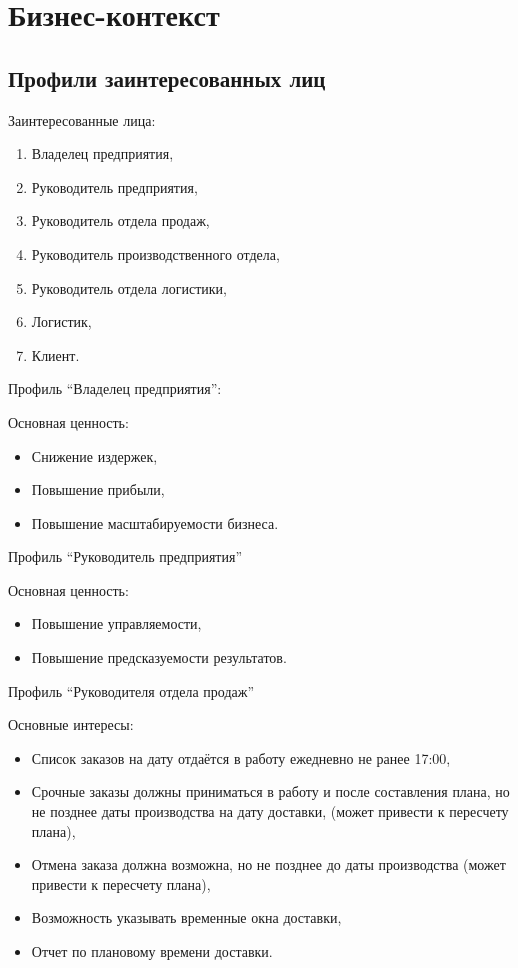 \chapter{Бизнес-контекст}
\label{ch:chap4}


\section{Профили заинтересованных лиц}
\label{sec:stakeholders}

Заинтересованные лица:
\begin{enumerate}[label=\arabic*]
    \item Владелец предприятия,
    \item Руководитель предприятия,
    \item Руководитель отдела продаж,
    \item Руководитель производственного отдела,
    \item Руководитель отдела логистики,
    \item Логистик,
    \item Клиент.
\end{enumerate}

Профиль ``Владелец предприятия'':

Основная ценность:
\begin{itemize}
    \item Снижение издержек,
    \item Повышение прибыли,
    \item Повышение масштабируемости бизнеса.
\end{itemize}

Профиль ``Руководитель предприятия''

Основная ценность:
\begin{itemize}
    \item Повышение управляемости,
    \item Повышение предсказуемости результатов.
\end{itemize}

Профиль ``Руководителя отдела продаж''

Основные интересы:
\begin{itemize}
    \item Список заказов на дату отдаётся в работу ежедневно не ранее 17:00,
    \item Срочные заказы должны приниматься в работу и после составления плана, но не позднее даты производства на дату доставки, (может привести к пересчету плана),
    \item Отмена заказа должна возможна, но не позднее до даты производства (может привести к пересчету плана),
    \item Возможность указывать временные окна доставки,
    \item Отчет по плановому времени доставки.
\end{itemize}

